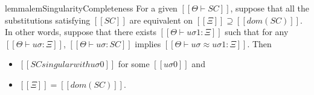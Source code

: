 \begin{restatable}{lemma}{lemSingularityCompleteness}
    \label{lemma:singularity-completeness}
    For a given $[[Θ ⊢ SC]]$,
    suppose that all the substitutions satisfying $[[SC]]$ are equivalent
    on $[[Ξ]] \supseteq [[dom(SC)]]$.
    In other words, suppose that there exists $[[Θ ⊢ uσ1 : Ξ]]$ such that
    for any $[[Θ ⊢ uσ : Ξ]]$, $[[Θ ⊢ uσ : SC]]$ implies 
    $[[Θ ⊢ uσ ≈ uσ1 : Ξ]]$.
    Then 
    \begin{itemize}
        \item $[[SC singular with uσ0]]$ for some $[[uσ0]]$ and
        \item $[[Ξ]] = [[dom(SC)]]$.
    \end{itemize} 
\end{restatable}
